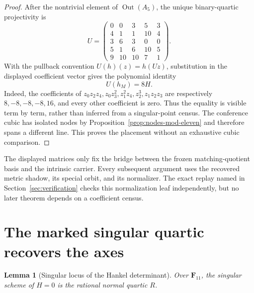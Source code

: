 \documentclass[11pt]{article}
\newtheorem{lemma}[theorem]{Lemma}
\theoremstyle{definition}
\theoremstyle{remark}
\newcommand{\F}{\mathbf F}
\begin{document}
\begin{proof}
After the nontrivial element of \(\operatorname{Out}(A_5)\), the unique
binary-quartic projectivity is
\[
 U=\begin{pmatrix}
 0&0&3&5&3\\
 4&1&1&10&4\\
 3&6&3&0&0\\
 5&1&6&10&5\\
 9&10&10&7&1
 \end{pmatrix}.
\]
With the pullback convention \(U(h)(z)=h(Uz)\), substitution in the displayed
coefficient vector gives the polynomial identity
\[
                         U(h_M)=8H.
\]
Indeed, the coefficients of
\(z_0z_2z_4,z_0z_3^2,z_1^2z_4,z_2^3,z_1z_2z_3\) are respectively
\(8,-8,-8,-8,16\), and every other coefficient is zero.  Thus the equality
is visible term by term, rather than inferred from a singular-point census.
The conference cubic has isolated nodes by
Proposition~\ref{prop:nodes-mod-eleven} and therefore spans a different line.  This
proves the placement without an exhaustive cubic comparison.
\end{proof}

The displayed matrices only fix the bridge between the frozen matching-quotient basis
and the intrinsic carrier.  Every subsequent argument uses the recovered
metric shadow, its special orbit, and its normalizer.  The exact replay named
in Section~\ref{sec:verification} checks this normalization leaf
independently, but no later theorem depends on a coefficient census.

\section{The marked singular quartic recovers the axes}
\label{sec:singular}

\begin{lemma}[Singular locus of the Hankel determinant]
\label{lem:hankel-singular-locus}
Over \(\F_{11}\), the singular scheme of \(H=0\) is the rational normal
quartic \(R\).
\end{lemma}
\end{document}
